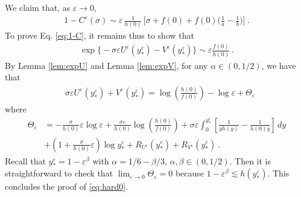 \documentclass[reqno, 12pt, a4paper]{amsart}
\theoremstyle{plain}
\theoremstyle{definition}
\begin{document}
\bigskip 
We claim that, as $\varepsilon \to 0$, 
\begin{equation}
\label{eq:1-C}
\begin{split}
1- C^\varepsilon (\sigma)  \sim \varepsilon \, \frac{1}{h(0)} \, \Big[ \sigma + f(0) +  f(0) \Big( \frac{1}{a} -\frac{1}{b} \Big)\Big] \ .
\end{split}
\end{equation}
\bigskip
To prove  Eq. \eqref{eq:1-C}, it remains thus to show that 
\begin{equation}
\label{eq:hard0}
\begin{split}
\exp \Big\{- \sigma \varepsilon U^\varepsilon (y^\varepsilon_*) - V^\varepsilon (y^\varepsilon_*)\Big\} \sim \varepsilon \frac{f(0)}{h(0)} \ .
\end{split}
\end{equation}
By Lemma \ref{lem:expU} and Lemma \ref{lem:expV}, for any $\alpha \in (0,1/2)$, we have that
\begin{equation}
\begin{split}
&\sigma \varepsilon U^\varepsilon(y^\varepsilon_*) + V^\varepsilon (y^\varepsilon_*) = \log \left( \frac{h(0)}{f(0)}\right) - \log \varepsilon + \Theta_\varepsilon
\end{split}
\end{equation}
 where 
 \begin{equation}
\begin{split}
\Theta_\varepsilon &= - \frac{\sigma}{h(0)} \varepsilon \log\varepsilon + \frac{\sigma \varepsilon}{h(0)} \log  \left( \frac{h(0)}{f(0)}\right) + \sigma \varepsilon \int_0^{y^\varepsilon_*} \left[ \frac{1}{y h(y)} -\frac{1}{h(0) y} \right] \, dy\\
&  + \left( 1+ \frac{\sigma}{h(0)} \varepsilon \right)  \log y^\varepsilon_* + R_{U^\varepsilon} (y^\varepsilon_*)  +R_{V^\varepsilon} (y^\varepsilon_*) \ .
\end{split}
\end{equation}
Recall that $y^\varepsilon_* =1- \varepsilon^\beta$ with $\alpha=1/6 - \beta/3$, $\alpha, \beta \in (0,1/2)$. Then it is straightforward to check that $\lim_{\varepsilon \to 0} \Theta_\varepsilon=0$ because $1- \varepsilon^\beta \lesssim h(y^\varepsilon_*)$. This concludes the proof of \eqref{eq:hard0}. 






%
%
\end{document}
